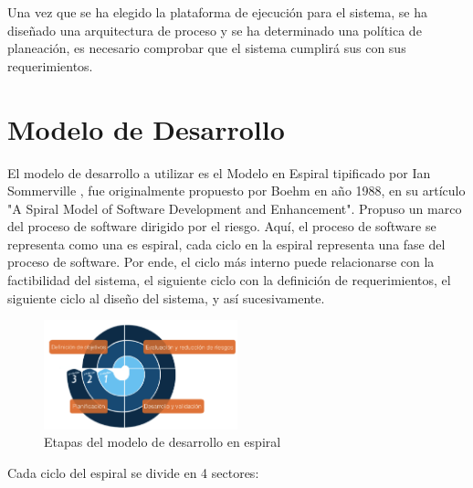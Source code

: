 Una vez que se ha elegido la plataforma de ejecución para el sistema, se ha diseñado una arquitectura de proceso y se ha determinado una política de
planeación, es necesario comprobar que el sistema cumplirá sus con sus requerimientos.

\section{Modelo de Desarrollo}

El modelo de desarrollo a utilizar es el Modelo en Espiral tipificado por Ian Sommerville\cite{Etiqueta00}%
, fue originalmente propuesto por Boehm en año 1988, en su artículo "A Spiral Model of Software Development and Enhancement". Propuso un
marco del proceso de software dirigido por el riesgo. Aquí, el proceso de software se representa como una es espiral, cada ciclo en la espiral
representa una fase del proceso de software. Por ende, el ciclo más interno puede relacionarse con la factibilidad del sistema, el siguiente ciclo
con la definición de requerimientos, el siguiente ciclo al diseño del sistema, y así sucesivamente. %

\begin{figure}[h!]
 \begin{center}
  \includegraphics[width=0.5\textwidth,keepaspectratio=true]{./images/ESPIRAL}
  \caption{Etapas del modelo de desarrollo en espiral}
  \label{fig:esquema}
 \end{center}
\end{figure}

Cada ciclo del espiral se divide en 4 sectores:
 
